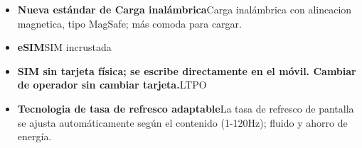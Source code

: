 
\begin{itemize}
  \item \textbf{Nueva estándar de Carga inalámbrica}Carga inalámbrica con alineacion magnetica, tipo MagSafe; más comoda para cargar.
  \item \textbf{eSIM}SIM incrustada
  \item \textbf{SIM sin tarjeta física; se escribe directamente en el móvil. Cambiar de operador sin cambiar tarjeta.}LTPO
  \item \textbf{Tecnologia de tasa de refresco adaptable}La tasa de refresco de pantalla se ajusta automáticamente según el contenido (1-120Hz); fluido y ahorro de energía.
\end{itemize}
